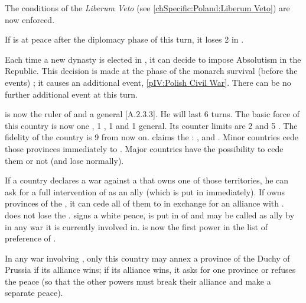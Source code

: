 

\phevnt
\aparag The conditions of the \textit{Liberum Veto} (see
\ref{chSpecific:Poland:Liberum Veto}) are now enforced.

\phadm
\aparag If \POL is at peace after the diplomacy phase of this turn, it loses 2
in \STAB.

\effetlong
\aparag Each time a new dynasty is elected in \POL, it can decide to impose
Absolutism in the Republic. This decision is made at the phase of the monarch
survival (before the events) ; it causes an additional event, \ref{pIV:Polish
  Civil War}. There can be no further additional event at this turn.





\phevnt
\aparag {} is now the ruler of \paysBrandebourg and a
general [A.2.3.3]. He will last 6 turns.  The basic force of this country is
now one \ARMY\faceplus, 1 \LD, 1 \fortress and 1 general. Its counter limits
are 2 \ARMY and 5 \LD.  The fidelity of the country is 9 from now on.
\aparag \paysBrandebourg claims the :
\provincePreussen,  and \provinceMemel.
\bparag Minor countries cede those provinces immediately to \paysBrandebourg.
\bparag Major countries have the possibility to cede them or not (and lose \PV
normally).

\phdipl
\aparag If a country declares a war against a \MAJ that owns one of those
territories, he can ask for a full intervention of \paysBrandebourg as an ally
(which is put in \EW immediately).
\aparag If \POL owns provinces of the , it can cede
all of them to \paysBrandebourg in exchange for an alliance with
\paysBrandebourg. \POL does not lose the \PV.  \paysBrandebourg signs a white
peace, is put in \EW of \POL and may be called as ally by \POL in any war it
is currently involved in.
\bparag \POL is now the first power in the list of preference of
\paysBrandebourg.

\phpaix
\aparag In any war involving \paysBrandebourg, only this country may annex a
province of the Duchy of Prussia if its alliance wins; if its alliance wins,
it asks for one province or refuses the peace (so that the other powers must
break their alliance and make a separate peace).



